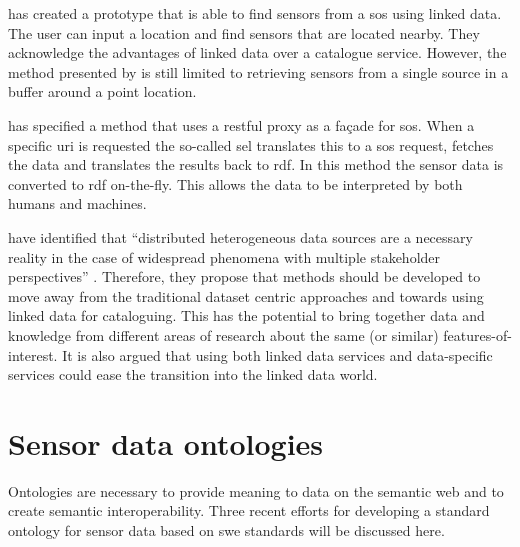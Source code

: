 \cite{SSW:Pschorr2} has created a prototype that is able to find sensors from a \ac{sos} using linked data. The user can input a location and find sensors that are located nearby. They acknowledge the advantages of linked data over a catalogue service. However, the method presented by \cite{SSW:Pschorr2} is still limited to retrieving sensors from a single source in a buffer around a point location.  

\cite{SSW:Janowicz} has specified a method that uses a \ac{rest}ful proxy as a fa\c{c}ade for \ac{sos}. When a specific \ac{uri} is requested the so-called \ac{sel} translates this to a \ac{sos} request, fetches the data and translates the results back to \ac{rdf}. In this method the sensor data is converted to \ac{rdf} on-the-fly. This allows the data to be interpreted by both humans and machines.  

\cite{SSW:Atkinson} have identified that \enquote{distributed heterogeneous data sources are a necessary reality in the case of widespread phenomena with multiple stakeholder perspectives} \cite[p.129]{SSW:Atkinson}. Therefore, they propose that methods should be developed to move away from the traditional dataset centric approaches and towards using linked data for cataloguing. This has the potential to bring together data and knowledge from different areas of research about the same (or similar) features-of-interest. It is also argued that using both linked data services and data-specific services could ease the transition into the linked data world.  

\section{Sensor data ontologies}

Ontologies are necessary to provide meaning to data on the semantic web and to create semantic interoperability. Three recent efforts for developing a standard ontology for sensor data based on \ac{swe} standards will be discussed here.

